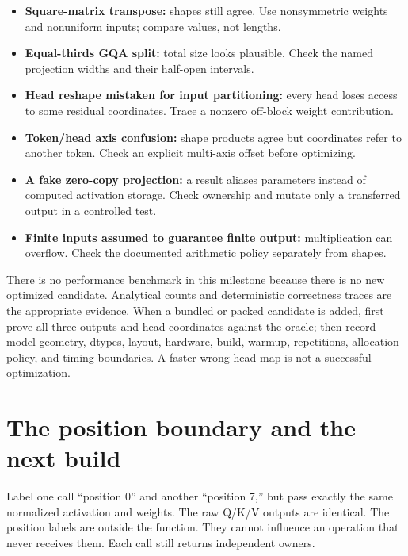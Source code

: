 \begin{itemize}
\tightlist
\item
  \textbf{Square-matrix transpose:} shapes still agree. Use nonsymmetric
  weights and nonuniform inputs; compare values, not lengths.
\item
  \textbf{Equal-thirds GQA split:} total size looks plausible. Check the
  named projection widths and their half-open intervals.
\item
  \textbf{Head reshape mistaken for input partitioning:} every head
  loses access to some residual coordinates. Trace a nonzero off-block
  weight contribution.
\item
  \textbf{Token/head axis confusion:} shape products agree but
  coordinates refer to another token. Check an explicit multi-axis
  offset before optimizing.
\item
  \textbf{A fake zero-copy projection:} a result aliases parameters
  instead of computed activation storage. Check ownership and mutate
  only a transferred output in a controlled test.
\item
  \textbf{Finite inputs assumed to guarantee finite output:}
  multiplication can overflow. Check the documented arithmetic policy
  separately from shapes.
\end{itemize}

There is no performance benchmark in this milestone because there is no
new optimized candidate. Analytical counts and deterministic correctness
traces are the appropriate evidence. When a bundled or packed candidate
is added, first prove all three outputs and head coordinates against the
oracle; then record model geometry, dtypes, layout, hardware, build,
warmup, repetitions, allocation policy, and timing boundaries. A faster
wrong head map is not a successful optimization.

\section{The position boundary and the next
build}\label{the-position-boundary-and-the-next-build}


Label one call ``position 0'' and another ``position 7,'' but pass
exactly the same normalized activation and weights. The raw Q/K/V
outputs are identical. The position labels are outside the function.
They cannot influence an operation that never receives them. Each call
still returns independent owners.


